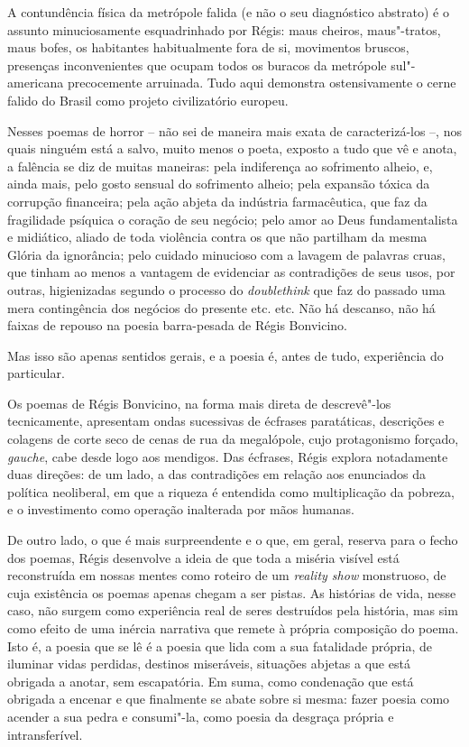 A contundência física da metrópole falida (e não o seu diagnóstico
abstrato) é o assunto minuciosamente esquadrinhado por Régis: maus
cheiros, maus"-tratos, maus bofes, os habitantes habitualmente fora de
si, movimentos bruscos, presenças inconvenientes que ocupam todos os
buracos da metrópole sul"-americana precocemente arruinada. Tudo aqui
demonstra ostensivamente o cerne falido do Brasil como projeto
civilizatório europeu.

Nesses poemas de horror -- não sei de maneira mais exata de
caracterizá-los --, nos quais ninguém está a salvo, muito menos o poeta,
exposto a tudo que vê e anota, a falência se diz de muitas maneiras:
pela indiferença ao sofrimento alheio, e, ainda mais, pelo gosto sensual
do sofrimento alheio; pela expansão tóxica da corrupção financeira; pela
ação abjeta da indústria farmacêutica, que faz da fragilidade psíquica o
coração de seu negócio; pelo amor ao Deus fundamentalista e midiático,
aliado de toda violência contra os que não partilham da mesma Glória da
ignorância; pelo cuidado minucioso com a lavagem de palavras cruas, que
tinham ao menos a vantagem de evidenciar as contradições de seus usos,
por outras, higienizadas segundo o processo do \emph{doublethink} que
faz do passado uma mera contingência dos negócios do presente etc. etc.
Não há descanso, não há faixas de repouso na poesia barra-pesada de
Régis Bonvicino.

Mas isso são apenas sentidos gerais, e a poesia é, antes de tudo,
experiência do particular.

Os poemas de Régis Bonvicino, na forma mais direta de descrevê"-los
tecnicamente, apresentam ondas sucessivas de écfrases paratáticas,
descrições e colagens de corte seco de cenas de rua da megalópole, cujo
protagonismo forçado, \emph{gauche}, cabe desde logo aos mendigos. Das
écfrases, Régis explora notadamente duas direções: de um lado, a das
contradições em relação aos enunciados da política neoliberal, em que a
riqueza é entendida como multiplicação da pobreza, e o investimento como
operação inalterada por mãos humanas.

De outro lado, o que é mais surpreendente e o que, em geral, reserva
para o fecho dos poemas, Régis desenvolve a ideia de que toda a miséria
visível está reconstruída em nossas mentes como roteiro de um
\emph{reality show} monstruoso, de cuja existência os poemas apenas
chegam a ser pistas. As histórias de vida, nesse caso, não surgem como
experiência real de seres destruídos pela história, mas sim como efeito
de uma inércia narrativa que remete à própria composição do poema. Isto
é, a poesia que se lê é a poesia que lida com a sua fatalidade própria,
de iluminar vidas perdidas, destinos miseráveis, situações abjetas a que
está obrigada a anotar, sem escapatória. Em suma, como condenação que
está obrigada a encenar e que finalmente se abate sobre si mesma: fazer
poesia como acender a sua pedra e consumi"-la, como poesia da desgraça
própria e intransferível.

